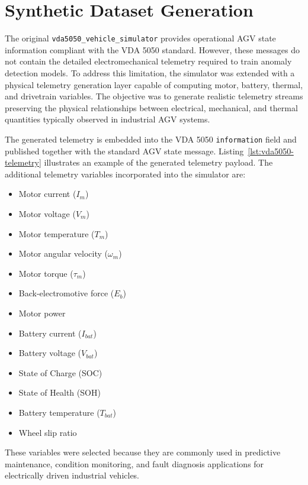 \section{Synthetic Dataset Generation}
\label{sec:synthetic_dataset_generation}

The original \texttt{vda5050\_vehicle\_simulator} provides operational AGV state information compliant with the VDA 5050 standard. However, these messages do not contain the detailed electromechanical telemetry required to train anomaly detection models. To address this limitation, the simulator was extended with a physical telemetry generation layer capable of computing motor, battery, thermal, and drivetrain variables. The objective was to generate realistic telemetry streams preserving the physical relationships between electrical, mechanical, and thermal quantities typically observed in industrial AGV systems.

The generated telemetry is embedded into the VDA 5050 \texttt{information} field and published together with the standard AGV state message. Listing~\ref{lst:vda5050-telemetry} illustrates an example of the generated telemetry payload. The additional telemetry variables incorporated into the simulator are:

\begin{itemize}
    \item Motor current ($I_m$)
    \item Motor voltage ($V_m$)
    \item Motor temperature ($T_m$)
    \item Motor angular velocity ($\omega_m$)
    \item Motor torque ($\tau_m$)
    \item Back-electromotive force ($E_b$)
    \item Motor power
    \item Battery current ($I_{bat}$)
    \item Battery voltage ($V_{bat}$)
    \item State of Charge (SOC)
    \item State of Health (SOH)
    \item Battery temperature ($T_{bat}$)
    \item Wheel slip ratio
\end{itemize}

These variables were selected because they are commonly used in predictive maintenance, condition monitoring, and fault diagnosis applications for electrically driven industrial vehicles. 

